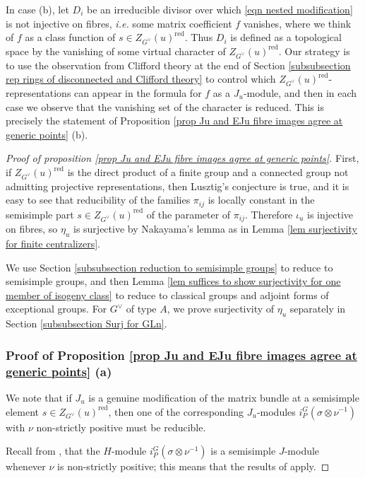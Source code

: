 \documentclass[10pt]{article}
\theoremstyle{definition}
\theoremstyle{remark}
\newcommand{\Zur}{Z_{G^\vee}(u)^{\mathrm{red}}}
\begin{document}
In case (b), let $D_i$ be an irreducible divisor over which \eqref{eqn nested modification} is not
injective on fibres, \textit{i.e.} some matrix coefficient $f$ vanishes, where we think of $f$ as a  class 
function of $s\in\Zur$. Thus $D_i$ is defined as a topological space by the vanishing of some virtual 
character of $\Zur$. Our strategy is to use the observation from Clifford theory at the end of Section 
\ref{subsubsection rep rings of disconnected and Clifford theory} to control which $\Zur$-representations
can appear in the formula for $f$ as a $J_u$-module, and then in each case we observe that the vanishing 
set of the character is reduced. This is precisely the statement of Proposition
\ref{prop Ju and EJu fibre images agree at generic points} (b).
%
\begin{proof}[Proof of proposition \ref{prop Ju and EJu fibre images agree at generic points}]

First, if $\Zur$ is the direct product of a finite group and a connected group 
not admitting projective
representations, then Lusztig's conjecture is true, and it is easy to see that 
reducibility of the families $\pi_{ij}$ is locally constant in the semisimple 
part $s\in\Zur$ of the parameter of $\pi_{ij}$. Therefore
$\iota_u$ is injective on fibres, so $\eta_u$ is surjective by Nakayama's 
lemma as in Lemma \ref{lem surjectivity for finite centralizers}.

We use Section \ref{subsubsection reduction to semisimple groups} to reduce to semisimple
groups, and then Lemma \ref{lem suffices to show surjectivity for one member of isogeny class} to 
reduce to classical groups and adjoint forms of exceptional groups. For $G^\vee$ of type $A$,
we prove surjectivity of $\eta_u$ separately in Section \ref{subsubsection Surj for GLn}.
%
\subsubsection{Proof of Proposition \ref{prop Ju and EJu fibre images agree at generic points} (a)}
%
We note that if $J_u$ is a genuine modification of 
the matrix bundle at a semisimple element $s\in\Zur$, then one of the corresponding $J_u$-modules 
$i_P^G(\sigma\otimes\nu^{-1})$ with $\nu$ non-strictly positive must be reducible.

Recall from \cite[2.2 (3) and Cor. 2.6]{BK}, that the $H$-module
$i_P^G(\sigma\otimes\nu^{-1})$ is a semisimple $J$-module 
whenever $\nu$ is non-strictly positive; this means that the results of \cite[Section 4]{SolSurvey} apply. 


\end{proof}
\end{document}
